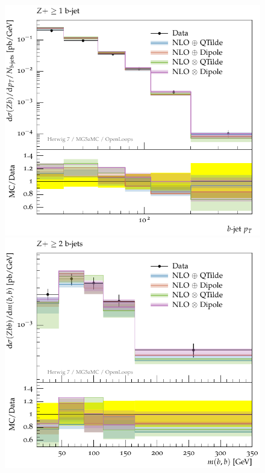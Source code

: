 \documentclass[11pt]{cernrep}
\newcommand{\Herwig}{H\protect\scalebox{0.8}{ERWIG}7\xspace}
\begin{document}

\begin{figure}[htbp]
\begin{center}
   \includegraphics[scale=0.65]{figs/zbb/herwigzb/atlas-d03-x01-y01.pdf}
   \includegraphics[scale=0.65]{figs/zbb/herwigzb/atlas-d23-x01-y01.pdf} \\

\end{center}
\end{figure}
\end{document}
